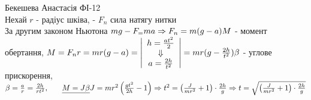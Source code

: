 \documentclass[a4paper,12pt]{article}
\begin{document}
Бекешева Анастасія ФІ-12\\
	 Нехай $r$ - радіус шківа, - $F_n$ сила натягу нитки\\ За другим законом Ньютона $mg-F_=ma\Rightarrow F_n=m(g-a)\\M$ - момент обертання, $M=F_nr=mr(g-a)=\left|\begin{array}{c}
	 	h=\frac{at^2}2\\\Downarrow\\a=\frac{2h}{t^2}
	 \end{array} \right|=mr(g-\frac{2h}{t^2})\\\beta$ - углове прискорення, $\beta=\frac ar=\frac{2h}{rt^2},\>\>\>\>\>\>\>\>\underline{M=J\beta}\\J=mr^2\left(\frac{gt^2}{2h}-1 \right)\Rightarrow t^2=\left(\frac{J}{mr^2}+1\right)\cdot\frac{2h}{g}\Rightarrow t=\sqrt{\left(\frac{J}{mr^2}+1\right)\cdot\frac{2h}{g}}$
\end{document}
